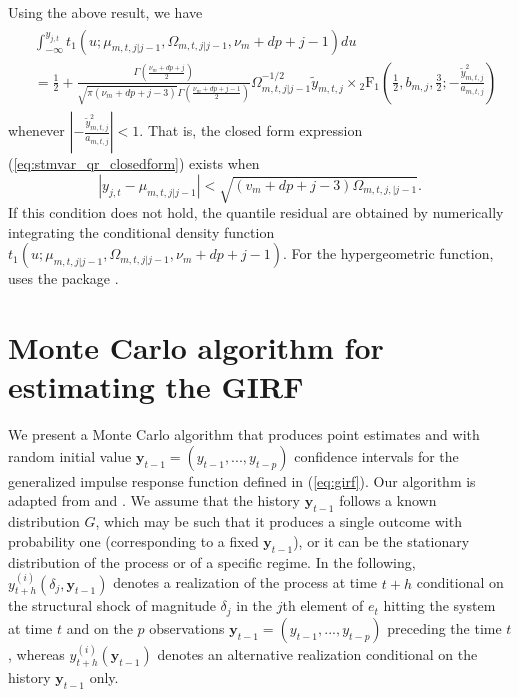 \documentclass[nojss]{jss}
\begin{document}
\begin{appendix}
Using the above result, we have
\begin{align}\label{eq:stmvar_qr_closedform}
\begin{aligned}
&\int_{-\infty}^{y_{j,t}}t_1(u;\mu_{m,t,j|j-1},\Omega_{m,t,j|j-1},\nu_m + dp + j - 1)du \\
&= \frac{1}{2} + \frac{\Gamma\left(\frac{\nu_m + dp + j}{2}\right)}{\sqrt{\pi (\nu_m + dp + j - 3)}\Gamma\left(\frac{\nu_m + dp + j - 1}{2} \right)}\Omega_{m,t,j|j-1}^{-1/2}\tilde{y}_{m,t,j} \times {}_2\text{F}_1\left(\frac{1}{2}, b_{m,j}, \frac{3}{2}; -\frac{\tilde{y}_{m,t,j}^2}{a_{m,t,j}} \right)
\end{aligned}
\end{align}
whenever $\left|-\frac{\tilde{y}_{m,t,j}^2}{a_{m,t,j}}\right|<1$.  That is,  the closed form expression (\ref{eq:stmvar_qr_closedform}) exists when
\begin{equation}
|y_{j,t} - \mu_{m,t,j|j-1}| < \sqrt{(v_m + dp + j - 3)\Omega_{m,t,j,|j-1}}.
\end{equation}
If this condition does not hold, the quantile residual are obtained by numerically integrating the conditional density function $t_1(u;\mu_{m,t,j|j-1},\Omega_{m,t,j|j-1},\nu_m + dp + j - 1)$. For the hypergeometric function,  uses the package  \citep{gsl}.


\section{Monte Carlo algorithm for estimating the GIRF}\label{sec:montecarlo}

We present a Monte Carlo algorithm that produces point estimates and with random initial value $\boldsymbol{y}_{t-1}=(y_{t-1},...,y_{t-p})$ confidence intervals for the generalized impulse response function defined in (\ref{eq:girf}). Our algorithm is adapted from \citet[pp. 135-136]{Koop+Pesaran+Potter:1996} and \citet[pp. 601-602]{Kilian+Lutkepohl:2017}. We assume that the history $\boldsymbol{y}_{t-1}$ follows a known distribution $G$, which may be such that it produces a single outcome with probability one (corresponding to a fixed $\boldsymbol{y}_{t-1}$), or it can be the stationary distribution of the process or of a specific regime. In the following, $y_{t+h}^{(i)}(\delta_j,\boldsymbol{y}_{t-1})$ denotes a realization of the process at time $t+h$ conditional on the structural shock of magnitude $\delta_j$ in the $j$th element of $e_t$ hitting the system at time $t$ and on the $p$ observations $\boldsymbol{y}_{t-1}=(y_{t-1},...,y_{t-p})$ preceding the time $t$, whereas $y_{t+h}^{(i)}(\boldsymbol{y}_{t-1})$ denotes an alternative realization conditional on the history $\boldsymbol{y}_{t-1}$ only.


\end{appendix}
\end{document}
